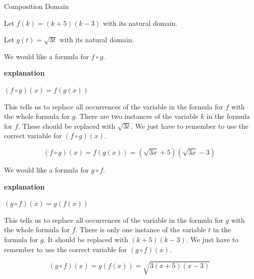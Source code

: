 \documentclass{ximera}
\begin{document}
\begin{example} Composition Domain


Let $f(k) = (k + 5)(k - 3)$ with its natural domain.


Let $g(t) = \sqrt{3t}$ with its natural domain.





We would like a formula for $f \circ g$. 

\textbf{\textcolor{red!75!green}{explanation}} 

$(f \circ g)(x) = f(g(x))$ 

This tells us to replace all occurrences of the variable in the formula for $f$ with the whole formula for $g$.  There are two instances of the variable $k$ in the formula for $f$.  These should be replaced with $\sqrt{3t}$. We just have to remember to use the correct variable for $(f \circ g)(x)$. 



\[
(f \circ g)(x) = f(g(x)) = (\sqrt{3x} + 5)(\sqrt{3x} - 3)
\]






We would like a formula for $g \circ f$. 

\textbf{\textcolor{red!75!green}{explanation}} 

$(g \circ f)(x) = g(f(x))$ 

This tells us to replace all occurrences of the variable in the formula for $g$ with the whole formula for $f$.  There is only one instance of the variable $t$ in the formula for $g$.  It should be replaced with $(k + 5)(k - 3)$. We just have to remember to use the correct variable for $(g \circ f)(x)$. 



\[
(g \circ f)(x) = g(f(x)) = \sqrt{3(x + 5)(x - 3)}
\]


\end{example}
\end{document}
